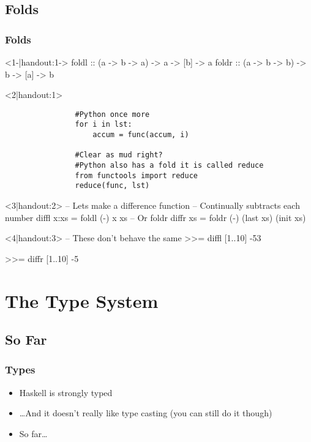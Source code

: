 \subsection{Folds}
\begin{frame}[t,fragile]
    \frametitle{Folds}
    \begin{overprint}
        \begin{hscode}<1-|handout:1->
            foldl :: (a -> b -> a) -> a -> [b] -> a
            foldr :: (a -> b -> b) -> b -> [a] -> b
        \end{hscode}

        \begin{onlyenv}<2|handout:1>
            \begin{verbatim}
                #Python once more
                for i in lst:
                    accum = func(accum, i)

                #Clear as mud right?
                #Python also has a fold it is called reduce
                from functools import reduce
                reduce(func, lst)
            \end{verbatim}
        \end{onlyenv}

        \begin{hscode}<3|handout:2>
            -- Lets make a difference function
            -- Continually subtracts each number
            diffl x:xs = foldl (-) x xs
            -- Or foldr
            diffr xs = foldr (-) (last xs) (init xs)
        \end{hscode}
        \begin{hscode}<4|handout:3>
            -- These don't behave the same
            >>= diffl [1..10]
            -53

            >>= diffr [1..10]
            -5
        \end{hscode}
    \end{overprint}
\end{frame}

\section{The Type System}
\subsection{So Far}
\begin{frame}[t,fragile]
    \frametitle{Types}
    \begin{overprint}
        \begin{itemize}
            \item<1-|handout:1> Haskell is strongly typed
            \item<2-|handout:1> \dots And it doesn't really like type casting (you can still do it though)
            \item<3-|handout:1> So far\dots
        \end{itemize}
    \end{overprint}
\end{frame}

